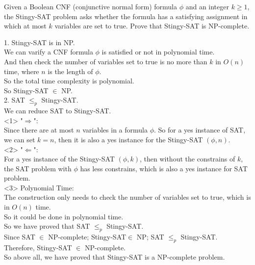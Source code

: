 \problem{}

Given a Boolean CNF (conjunctive normal form) formula $\phi$ and an integer $k \geq 1$, the Stingy-SAT problem asks whether the formula has a satisfying assignment in which at most $k$ variables are set to true. Prove that Stingy-SAT is NP-complete.

\solution{}

1. Stingy-SAT is in NP.\\
We can varify a CNF formula \(\phi\) is satisfied or not in polynomial time.\\
And then check the number of variables set to true is no more than \(k\) in $O(n)$ time, where $n$ is the length of $\phi$.\\
So the total time complexity is polynomial.\\
So Stingy-SAT $\in$ NP.\\

2. SAT $\leq_p$ Stingy-SAT.\\
We can reduce SAT to Stingy-SAT.\\

<1> "$\Rightarrow$":\\
Since there are at most $n$ variables in a formula $\phi$. So for a yes instance of SAT, we can set $k=n$, then it is also a yes instance for the Stingy-SAT $(\phi,n)$.\\

<2> "$\Leftarrow$":\\
For a yes instance of the Stingy-SAT $(\phi,k)$, then without the constrains of $k$, the SAT problem with $\phi$ has less constrains, which is also a yes instance for SAT problem.\\

<3> Polynomial Time:\\
The construction only needs to check the number of variables set to true, which is in $O(n)$ time.\\
So it could be done in polynomial time.\\
So we have proved that SAT $\leq_p$ Stingy-SAT.\\

Since SAT $\in$ NP-complete; Stingy-SAT$\in$ NP; SAT $\leq_p$ Stingy-SAT.\\
Therefore, Stingy-SAT $\in$ NP-complete.\\

So above all, we have proved that Stingy-SAT is a NP-complete problem.

\newpage